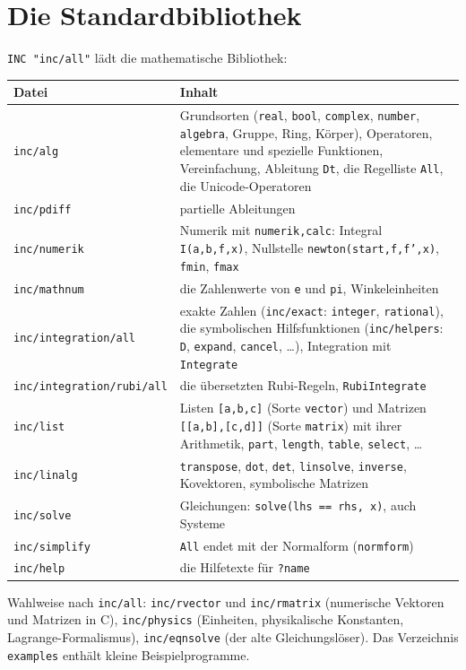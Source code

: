 \documentclass[a4paper,11pt]{article}
\newcommand{\kw}[1]{\texttt{#1}}
\begin{document}
\section{Die Standardbibliothek}
\kw{INC "inc/all"} lädt die mathematische Bibliothek:

\medskip
\noindent
\begin{tabularx}{\textwidth}{@{}lX@{}}
\toprule
Datei & Inhalt \\
\midrule
\kw{inc/alg} & Grundsorten (\kw{real}, \kw{bool}, \kw{complex},
  \kw{number}, \kw{algebra}, Gruppe, Ring, Körper), Operatoren, elementare
  und spezielle Funktionen, Vereinfachung, Ableitung \kw{Dt}, die
  Regelliste \kw{All}, die Unicode-Operatoren \\
\kw{inc/pdiff} & partielle Ableitungen \\
\kw{inc/numerik} & Numerik mit \kw{numerik,calc}: Integral
  \kw{I(a,b,f,x)}, Nullstelle \kw{newton(start,f,f',x)}, \kw{fmin},
  \kw{fmax} \\
\kw{inc/mathnum} & die Zahlenwerte von \kw{e} und \kw{pi}, Winkeleinheiten \\
\kw{inc/integration/all} & exakte Zahlen (\kw{inc/exact}: \kw{integer},
  \kw{rational}), die symbolischen Hilfsfunktionen (\kw{inc/helpers}:
  \kw{D}, \kw{expand}, \kw{cancel}, \ldots), Integration mit
  \kw{Integrate} \\
\kw{inc/integration/rubi/all} & die übersetzten Rubi-Regeln,
  \kw{RubiIntegrate} \\
\kw{inc/list} & Listen \kw{[a,b,c]} (Sorte \kw{vector}) und Matrizen
  \kw{[[a,b],[c,d]]} (Sorte \kw{matrix}) mit ihrer Arithmetik,
  \kw{part}, \kw{length}, \kw{table}, \kw{select}, \ldots \\
\kw{inc/linalg} & \kw{transpose}, \kw{dot}, \kw{det}, \kw{linsolve},
  \kw{inverse}, Kovektoren, symbolische Matrizen \\
\kw{inc/solve} & Gleichungen: \kw{solve(lhs == rhs, x)}, auch Systeme \\
\kw{inc/simplify} & \kw{All} endet mit der Normalform (\kw{normform}) \\
\kw{inc/help} & die Hilfetexte für \kw{?name} \\
\bottomrule
\end{tabularx}

\medskip
Wahlweise nach \kw{inc/all}: \kw{inc/rvector} und \kw{inc/rmatrix}
(numerische Vektoren und Matrizen in C), \kw{inc/physics} (Einheiten,
physikalische Konstanten, Lagrange-Formalismus), \kw{inc/eqnsolve} (der
alte Gleichungslöser). Das Verzeichnis \kw{examples} enthält kleine
Beispielprogramme.
\end{document}
